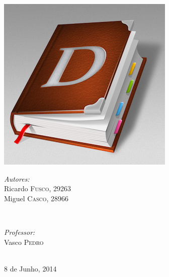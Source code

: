 \begin{titlepage}
\includegraphics[scale=0.65]{dictionary.png}\\[1cm]

\begin{minipage}{0.4\textwidth}
\begin{flushleft} \large
\emph{Autores:}\\
Ricardo \textsc{Fusco}, 29263\\
Miguel \textsc{Casco}, 28966
\end{flushleft}
\end{minipage}
~
\begin{minipage}{0.4\textwidth}
\begin{flushright} \large
\emph{Professor:} \\
Vasco \textsc{Pedro}
\end{flushright}
\end{minipage}\\[2cm]



{\large 8 de Junho, 2014}\\[1cm] %
 

\vfill %

\end{titlepage}

